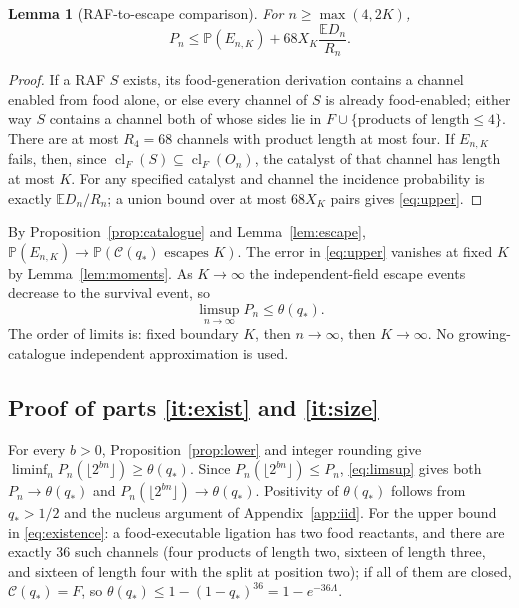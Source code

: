\documentclass[11pt,letterpaper]{article}
\theoremstyle{plain}
\newtheorem{lemma}[theorem]{Lemma}
\theoremstyle{definition}
\theoremstyle{remark}
\numberwithin{equation}{section}
\newcommand{\PP}{\mathbb P}
\newcommand{\EE}{\mathbb E}
\newcommand{\cC}{\mathcal C}
\newcommand{\cl}{\operatorname{cl}}
\newcommand{\thetaq}{\theta(q_*)}
\begin{document}
\begin{lemma}[RAF-to-escape comparison]\label{lem:upper}
For $n\ge\max(4,2K)$,
\begin{equation}\label{eq:upper}
 P_n\le\PP(E_{n,K})+68X_K\frac{\EE D_n}{R_n}.
\end{equation}
\end{lemma}
\begin{proof}
If a RAF $S$ exists, its food-generation derivation contains a channel enabled from food alone, or else every channel of $S$ is already food-enabled; either way $S$ contains a channel both of whose sides lie in $F\cup\{\text{products of length}\le4\}$. There are at most $R_4=68$ channels with product length at most four. If $E_{n,K}$ fails, then, since $\cl_F(S)\subseteq\cl_F(O_n)$, the catalyst of that channel has length at most $K$. For any specified catalyst and channel the incidence probability is exactly $\EE D_n/R_n$; a union bound over at most $68X_K$ pairs gives \eqref{eq:upper}.
\end{proof}

By Proposition~\ref{prop:catalogue} and Lemma~\ref{lem:escape}, $\PP(E_{n,K})\to\PP(\cC(q_*)\text{ escapes }K)$. The error in \eqref{eq:upper} vanishes at fixed $K$ by Lemma~\ref{lem:moments}. As $K\to\infty$ the independent-field escape events decrease to the survival event, so
\begin{equation}\label{eq:limsup}
 \limsup_{n\to\infty}P_n\le\thetaq .
\end{equation}
The order of limits is: fixed boundary $K$, then $n\to\infty$, then $K\to\infty$. No growing-catalogue independent approximation is used.

\subsection{Proof of parts \texorpdfstring{\ref{it:exist}}{(i)} and \texorpdfstring{\ref{it:size}}{(ii)}}
For every $b>0$, Proposition~\ref{prop:lower} and integer rounding give $\liminf_nP_n(\lfloor2^{bn}\rfloor)\ge\thetaq$. Since $P_n(\lfloor2^{bn}\rfloor)\le P_n$, \eqref{eq:limsup} gives both $P_n\to\thetaq$ and $P_n(\lfloor2^{bn}\rfloor)\to\thetaq$. Positivity of $\thetaq$ follows from $q_*>1/2$ and the nucleus argument of Appendix~\ref{app:iid}. For the upper bound in \eqref{eq:existence}: a food-executable ligation has two food reactants, and there are exactly $36$ such channels (four products of length two, sixteen of length three, and sixteen of length four with the split at position two); if all of them are closed, $\cC(q_*)=F$, so $\theta(q_*)\le1-(1-q_*)^{36}=1-e^{-36\Lambda}$.
\end{document}
